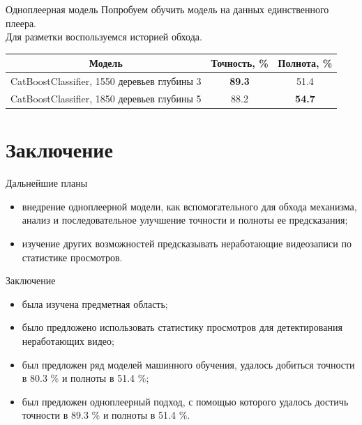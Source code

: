\documentclass{beamer}
\begin{document}
\begin{frame}{Одноплеерная модель}
    Попробуем обучить модель на данных единственного плеера. \\
    Для разметки воспользуемся историей обхода.
    \begin{table}
        \centering
        \begin{tabular}{|c|c|c|}
            \hline
            Модель & Точность, \% & Полнота, \% \\
            \hline
            CatBoostClassifier, 1550 деревьев глубины 3 & \textbf{89.3} & 51.4 \\
            \hline
            CatBoostClassifier, 1850 деревьев глубины 5 & 88.2 & \textbf{54.7} \\
            \hline
        \end{tabular}
    \end{table}
\end{frame}

\section{Заключение}

\begin{frame}{Дальнейшие планы}
    \begin{itemize}
        \item внедрение одноплеерной модели, как вспомогательного для обхода механизма, анализ и последовательное улучшение точности и полноты ее предсказания;
        \item изучение других возможностей предсказывать неработающие видеозаписи по статистике просмотров.
    \end{itemize}
\end{frame}

\begin{frame}{Заключение}
    \begin{itemize}
        \item была изучена предметная область;
        \item было предложено использовать статистику просмотров для детектирования неработающих видео;
        \item был предложен ряд моделей машинного обучения, удалось добиться точности в 80.3 \% и полноты в 51.4 \%;
        \item был предложен одноплеерный подход, с помощью которого удалось достичь точности в 89.3 \% и полноты в 51.4 \%.
    \end{itemize}
\end{frame}
\end{document}
